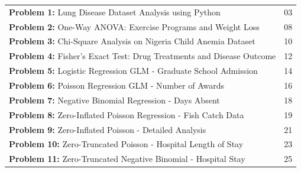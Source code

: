 \documentclass[12pt, a4paper]{article}
\begin{document}
\newpage
\pagestyle{empty}

\begin{center}
    \begin{tcolorbox}[
        colback=Parchment, 
        colframe=RoyalNavy, 
        width=0.9\textwidth, 
        arc=0mm, 
        boxrule=1.5pt, 
        leftrule=4pt, %
        titlerule=1pt,
        title={\centering\Huge\bfseries\scshape Table of Contents},
        coltitle=white,
        colbacktitle=RoyalNavy,
        fonttitle=\bfseries,
        bottomrule=1.5pt,
        toprule=1.5pt
    ]
    \vspace{0.8cm}
    \renewcommand{\arraystretch}{1.6} %
    \begin{tabular}{p{} r}
        \textbf{\color{RoyalNavy}Problem 1:} Lung Disease Dataset Analysis using Python & 03 \\
        \textbf{\color{RoyalNavy}Problem 2:} One-Way ANOVA: Exercise Programs and Weight Loss & 08 \\
        \textbf{\color{RoyalNavy}Problem 3:} Chi-Square Analysis on Nigeria Child Anemia Dataset & 10 \\
        \textbf{\color{RoyalNavy}Problem 4:} Fisher's Exact Test: Drug Treatments and Disease Outcome & 12 \\
        \textbf{\color{RoyalNavy}Problem 5:} Logistic Regression GLM - Graduate School Admission & 14\\
        \textbf{\color{RoyalNavy}Problem 6:} Poisson Regression GLM - Number of Awards & 16\\
        \textbf{\color{RoyalNavy}Problem 7:} Negative Binomial Regression - Days Absent & 18\\
        \textbf{\color{RoyalNavy}Problem 8:} Zero-Inflated Poisson Regression - Fish Catch Data & 19\\
        \textbf{\color{RoyalNavy}Problem 9:} Zero-Inflated Poisson - Detailed Analysis & 21\\
        \textbf{\color{RoyalNavy}Problem 10:} Zero-Truncated Poisson - Hospital Length of Stay & 23\\
        \textbf{\color{RoyalNavy}Problem 11:} Zero-Truncated Negative Binomial - Hospital Stay & 25\\
    \end{tabular}
    \vspace{0.5cm}
    \end{tcolorbox}
\end{center}
\end{document}
